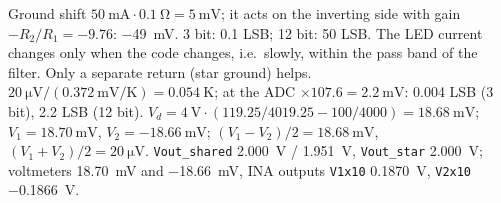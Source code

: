 \begin{solution}
\begin{talist}
\ta Ground shift $\SI{50}{\milli\ampere}\cdot\SI{0.1}{\ohm} = \SI{5}{\milli\volt}$; it acts on the inverting side with gain $-R_2/R_1 = -9.76$:
	\SI{-49}{\milli\volt}. 3 bit: 0.1 LSB; 12 bit: 50 LSB.
\ta The LED current changes only when the code changes, i.e.\ slowly, within the pass band of the filter. Only a separate return (star ground) helps.
\ta $\SI{20}{\micro\volt}/(\SI{0.372}{\milli\volt\per\kelvin}) = \SI{0.054}{\kelvin}$; at the ADC $\times 107.6 = \SI{2.2}{\milli\volt}$: 0.004 LSB (3 bit), 2.2 LSB (12 bit).
\ta $V_d = \SI{4}{\volt}\cdot(119.25/4019.25 - 100/4000) = \SI{18.68}{\milli\volt}$; $V_1 = \SI{18.70}{\milli\volt}$, $V_2 = \SI{-18.66}{\milli\volt}$;
	$(V_1 - V_2)/2 = \SI{18.68}{\milli\volt}$, $(V_1 + V_2)/2 = \SI{20}{\micro\volt}$.
\ta {}\newline \texttt{Vout\_shared} \SI{2.000}{\volt} / \SI{1.951}{\volt}, \texttt{Vout\_star} \SI{2.000}{\volt};\newline
	\newline voltmeters \SI{18.70}{\milli\volt} and \SI{-18.66}{\milli\volt}, INA outputs \texttt{V1x10} \SI{0.1870}{\volt}, \texttt{V2x10} \SI{-0.1866}{\volt}.
\end{talist}
\end{solution}

